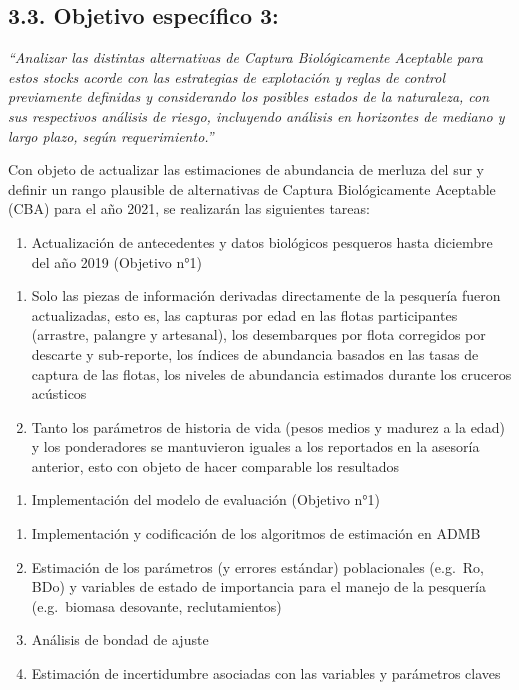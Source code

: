 \documentclass[
  spanish,
]{article}
\providecommand{\tightlist}{%
  \setlength{\itemsep}{0pt}\setlength{\parskip}{0pt}}
\begin{document}
\hypertarget{objetivo-especuxedfico-3}{%
\subsection{3.3. Objetivo específico
3:}\label{objetivo-especuxedfico-3}}

\emph{``Analizar las distintas alternativas de Captura Biológicamente
Aceptable para estos stocks acorde con las estrategias de explotación y
reglas de control previamente definidas y considerando los posibles
estados de la naturaleza, con sus respectivos análisis de riesgo,
incluyendo análisis en horizontes de mediano y largo plazo, según
requerimiento.''}

Con objeto de actualizar las estimaciones de abundancia de merluza del
sur y definir un rango plausible de alternativas de Captura
Biológicamente Aceptable (CBA) para el año 2021, se realizarán las
siguientes tareas:

\begin{enumerate}
\def\labelenumi{\arabic{enumi}.}
\tightlist
\item
  Actualización de antecedentes y datos biológicos pesqueros hasta
  diciembre del año 2019 (Objetivo n°1)
\end{enumerate}

\begin{enumerate}
\def\labelenumi{\roman{enumi}.}
\tightlist
\item
  Solo las piezas de información derivadas directamente de la pesquería
  fueron actualizadas, esto es, las capturas por edad en las flotas
  participantes (arrastre, palangre y artesanal), los desembarques por
  flota corregidos por descarte y sub-reporte, los índices de abundancia
  basados en las tasas de captura de las flotas, los niveles de
  abundancia estimados durante los cruceros acústicos
\item
  Tanto los parámetros de historia de vida (pesos medios y madurez a la
  edad) y los ponderadores se mantuvieron iguales a los reportados en la
  asesoría anterior, esto con objeto de hacer comparable los resultados
\end{enumerate}

\begin{enumerate}
\def\labelenumi{\arabic{enumi}.}
\setcounter{enumi}{1}
\tightlist
\item
  Implementación del modelo de evaluación (Objetivo n°1)
\end{enumerate}

\begin{enumerate}
\def\labelenumi{\roman{enumi}.}
\tightlist
\item
  Implementación y codificación de los algoritmos de estimación en ADMB
\item
  Estimación de los parámetros (y errores estándar) poblacionales
  (e.g.~Ro, BDo) y variables de estado de importancia para el manejo de
  la pesquería (e.g.~biomasa desovante, reclutamientos)
\item
  Análisis de bondad de ajuste
\item
  Estimación de incertidumbre asociadas con las variables y parámetros
  claves
\end{enumerate}
\end{document}

